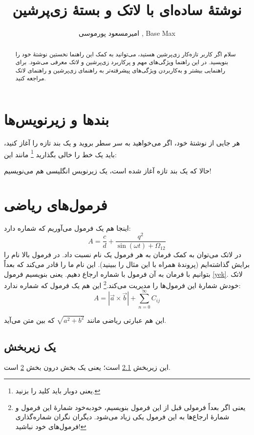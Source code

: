 \documentclass[10pt]{article}
\title{نوشتهٔ ساده‌ای با لاتک و بستهٔ زی‌پرشین}
\author{امیرمسعود پورموسی , Base Max
 	\\ \small\lr{Sample Text}
 }
\begin{document}
	\maketitle
	
	\begin{abstract}
		سلام اگر کاربر تازه‌کار زی‌پرشین هستید، می‌توانید به کمک این راهنما نخستین نوشتهٔ خود را بنویسید. در این راهنما ویژگی‌های مهم و پرکاربرد زی‌پرشین و لاتک معرفی می‌شود. برای راهنمایی بیشتر و به‌کاربردن ویژگی‌های پیشرفته‌تر به راهنمای زی‌پرشین و راهنمای لاتک مراجعه کنید.
	\end{abstract}
	\section{بندها و زیرنویس‌ها}
	هر جایی از نوشتهٔ خود، اگر می‌خواهید به سر سطر بروید و یک بند تازه را آغاز کنید، باید یک خط را خالی بگذارید
	\footnote{یعنی دوبار باید کلید  را بزنید.}
	مانند این:
	
	حالا که یک بند تازه آغاز شده است، یک زیرنویس انگلیسی
	هم می‌نویسیم!
	\section{فرمول‌های ریاضی}\label{formula}
	
	اینجا هم یک فرمول می‌آوریم که شماره دارد:
	\begin{equation}\label{yek}
	A=\frac{c}{d}+\frac{q^2}{\sin(\omega t)+\Omega_{12}}
	\end{equation}
	در لاتک می‌توان به کمک فرمان 
	به هر فرمول یک نام نسبت داد. در فرمول بالا نام  را برایش گذاشته‌ایم (پروندهٔ  همراه با این مثال را ببینید). این نام ما را قادر می‌کند که بعداً بتوانیم با فرمان
	به آن فرمول با شماره ارجاع دهیم. یعنی بنویسیم فرمول \ref{yek}. 
	لاتک خودش شمارهٔ این فرمول‌ها را مدیریت می‌کند.\footnote{یعنی اگر بعداً فرمولی قبل از این فرمول بنویسیم، خودبه‌خود شمارهٔ این فرمول و شمارهٔ ارجاع‌ها به این فرمول یکی زیاد می‌شود. دیگران نگران شماره‌گذاری فرمول‌های خود نباشید!} این هم یک فرمول که شماره ندارد:
	$$A=|\vec{a}\times \vec{b}| + \sum_{n=0}^\infty C_{ij}$$
	
	این هم عبارتی ریاضی مانند 
	$\sqrt{a^2+b^2}$
	که بین متن می‌آید.
	\subsection{یک زیربخش}\label{zirbakhsh}
	
	این زیربخش \ref{zirbakhsh} است؛ یعنی یک بخش درون بخش \ref{formula} است.
\end{document}
